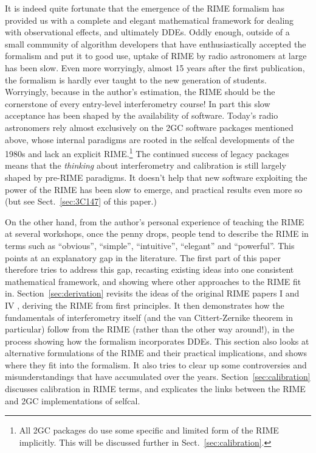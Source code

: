\documentclass[]{aa}
\begin{document}
It is indeed quite fortunate that the emergence of the RIME formalism has provided us with a complete and elegant mathematical framework for dealing with observational effects, and ultimately DDEs. Oddly enough, outside of a small community of algorithm developers that have enthusiastically accepted the formalism and put it to good use, uptake of RIME by radio astronomers at large has been slow. Even more worryingly, almost 15 years after the first publication, the formalism is hardly ever taught to the new generation of students. Worryingly, because in the author's estimation, the RIME should be the cornerstone of every entry-level interferometry course! In part this slow acceptance has been shaped by the availability of software. Today's radio astronomers rely almost exclusively on the 2GC software packages mentioned above, whose internal paradigms are rooted in the selfcal developments of the 1980s and lack an explicit RIME.\footnote{All 2GC packages do use some specific and limited form of the RIME implicitly. This will be discussed further in Sect.~\ref{sec:calibration}.} The continued success of legacy packages means that the {\em thinking} about interferometry and calibration is still largely shaped by pre-RIME paradigms. It doesn't help that new software exploiting the power of the RIME has been slow to emerge, and practical results even more so (but see Sect.~\ref{sec:3C147} of this paper.)  

On the other hand, from the author's personal experience of teaching the RIME at several workshops, once the penny drops, people tend to describe the RIME in terms such as ``obvious'', ``simple'', ``intuitive'', ``elegant'' and ``powerful''. This points at an explanatory gap in the literature. The first part of this paper therefore tries to address this gap, recasting existing ideas into one consistent mathematical framework, and showing where other approaches to the RIME fit in. Section~\ref{sec:derivation} revisits the ideas of the original RIME papers I \citep{ME1} and IV \citep{ME4}, deriving the RIME from first principles. It then demonstrates how the fundamentals of interferometry itself (and the van Cittert-Zernike theorem in particular) follow from the RIME (rather than the other way around!), in the process showing how the formalism incorporates DDEs. This section also looks at alternative formulations of the RIME and their practical implications, and shows where they fit into the formalism. It also tries to clear up some controversies and misunderstandings that have accumulated over the years. Section~\ref{sec:calibration} discusses calibration in RIME terms, and explicates the links between the RIME and 2GC implementations of selfcal. 
\end{document}
